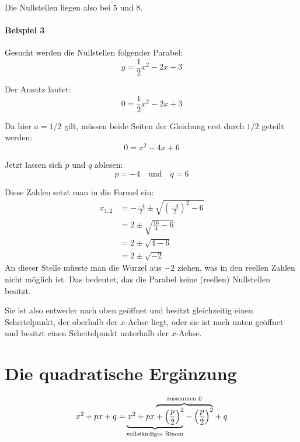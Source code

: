 \documentclass
[
  draft    = true,
  fontsize = 11pt,
  parskip  = half-,
  BCOR     = 0pt,
  DIV      = calc
]
{scrartcl}
\begin{document}
Die Nullstellen liegen also bei $5$ und $8$.

\paragraph{Beispiel 3}
Gesucht werden die Nullstellen folgender Parabel:
\begin{equation*}
  y=\frac{1}{2}x^{2}-2x+3
\end{equation*}

Der Ansatz lautet:
\begin{equation*}
  0=\frac{1}{2}x^{2}-2x+3
\end{equation*}

Da hier $a=1/2$ gilt, müssen beide Seiten der Gleichung erst durch $1/2$ geteilt werden:
\begin{equation*}
  0=x^{2}-4x+6
\end{equation*}

Jetzt lassen sich $p$ und $q$ ablesen:
\begin{equation*}
    p=-4\quad\text{und}\quad q=6
\end{equation*}

Diese Zahlen setzt man in die Formel ein:
\begin{equation*}
  \begin{split}
    x_{1,2}&=-\frac{-4}{2}\pm\sqrt{\left(\frac{-4}{2}\right)^{2}-6} \\[1ex]
           &=2\pm\sqrt{\frac{16}{4}-6} \\[1ex]
           &=2\pm\sqrt{4-6} \\[1ex]
           &=2\pm\sqrt{-2}
  \end{split}
\end{equation*}
An dieser Stelle müsste man die Wurzel aus $-2$ ziehen, was in den reellen
Zahlen nicht möglich ist. Das bedeutet, das die Parabel keine (reellen)
Nullstellen besitzt.

Sie ist also entweder nach oben geöffnet und besitzt gleichzeitig einen
Scheitelpunkt, der oberhalb der $x$-Achse liegt, oder sie ist nach unten
geöffnet und besitzt einen Scheitelpunkt unterhalb der $x$-Achse.

\section*{Die quadratische Ergänzung}
\begin{equation*}
  \text
  {%
    \makebox[0pt][l]
    {%
      $\displaystyle
       \hphantom{x^{2}+px+q=x^{2}+px}%
       \overbrace
       {%
         \phantom{+\left(\frac{p}{2}\right)^{2}-\left(\frac{p}{2}\right)^{2}}%
       }
       ^
       {%
         \text{zusammen 0}%
       }%
      $
    }%
  }%
  \text
  {%
    \makebox[0pt][l]
    {%
      $\displaystyle
       \hphantom{x^{2}+px+q=}%
       \underbrace
       {%
         \phantom{x^{2}+px+\left(\frac{p}{2}\right)^{2}}%
       }
       _
       {%
         \text{\makebox[0pt][c]{vollständiges Binom}}%
       }%
      $
    }%
  }%
  x^{2}+px+q
  =
  x^{2}+px+\left(\frac{p}{2}\right)^{2}-\left(\frac{p}{2}\right)^{2}+q
\end{equation*}
\end{document}
